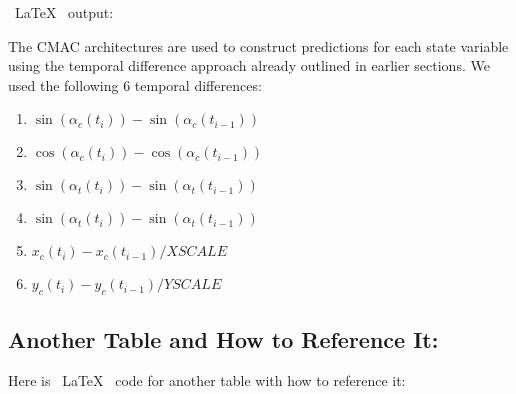 \documentclass[11pt]{SelfArxOneColBMN}
\begin{document}
\noindent
~\LaTeX~ output:

\noindent
The CMAC architectures are used to 
construct predictions for each state variable using the temporal difference
approach already outlined in earlier sections. 
We used the following $6$ temporal differences:

\begin{enumerate}
\item $\sin(\alpha_c(t_i))-\sin(\alpha_c(t_{i-1}))$
\item $\cos(\alpha_c(t_i))-\cos(\alpha_c(t_{i-1}))$
\item $\sin(\alpha_t(t_i))-\sin(\alpha_t(t_{i-1}))$
\item $\sin(\alpha_t(t_i))-\sin(\alpha_t(t_{i-1}))$
\item $x_c(t_i)-x_c(t_{i-1})/XSCALE$
\item $y_c(t_i)-y_c(t_{i-1})/YSCALE$
\end{enumerate}

\subsection{Another Table and How to Reference It:}

Here is ~\LaTeX~ code for another table with how to reference it:
\end{document}
